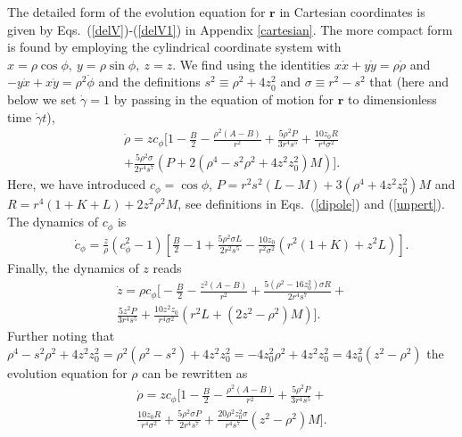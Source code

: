 The detailed form of the evolution equation for $\bm r$ in Cartesian coordinates is given by Eqs.~(\ref{delV})-(\ref{delV1}) in Appendix \ref{cartesian}. The more compact form is found by employing the cylindrical coordinate system with $x = \rho \cos\phi,\ y = \rho \sin\phi,\ z=z$. We find using the identities $x \dot x + y \dot y = \rho \dot\rho$ and $-y \dot x + x \dot y = \rho^2 \dot\phi$ and the definitions $s^2\equiv \rho^2+4z_0^2$ and $\sigma\equiv r^2-s^2$ that (here and below we set $\dot{\gamma}=1$ by passing in the equation of
motion for $\bm r$ to dimensionless time $\dot{\gamma} t$),
\begin{equation} \begin{aligned} %
\dot\rho = z c_{\phi}
[
1-\frac{B}{2}-\frac{\rho^2(A-B)}{r^2}
+\frac{5\rho^2 P}{3r^4s^5}
+\frac{10z_0 R}{r^4\sigma^2} \\
+\frac{5\rho^2\sigma}{2r^4s^7}
(P+2(\rho^4-s^2\rho^2+4z^2z_0^2)M)
].
\label{rho}
\end{aligned}
\end{equation}
Here, we have introduced $c_{\phi} = \cos\phi$, $P = r^2s^2(L-M)+3(\rho^4+4z^2z_0^2)M$ and
$R = r^4(1+K+L)+2z^2\rho^2M$, see definitions in Eqs.~(\ref{dipole}) and (\ref{unpert}). The dynamics of $c_{\phi}$ is
\begin{eqnarray}&&\!\!\!\!\!\!\!\!\!\!\!\!\!\!\!\!\!\!\!\!
\dot c_{\phi} = \frac{z}{\rho}(c_{\phi}^2-1)\left[
\frac{B}{2}-1+
\frac{5\rho^2\sigma L}{2r^2s^5}
-\frac{10z_0}{r^2\sigma^2}(r^2(1+K)+z^2L)
\right].
\label{phi1}
\end{eqnarray}
Finally, the dynamics of $z$ reads
\begin{equation} \begin{aligned} %
\dot z = \rho c_{\phi}
\bigg[
-\frac{B}{2}-\frac{z^2(A-B)}{r^2}
+\frac{5(\rho^2-16z_0^2)\sigma R}{2r^4s^7}
+\\ \frac{5z^2 P}{3r^4s^5} 
+\frac{10z^2 z_0}{r^4\sigma^2}(r^2 L+(2z^2-\rho^2)M)
\bigg].
\label{zz}
\end{aligned}
\end{equation}
Further noting that $\rho^4-s^2\rho^2+4z^2z_0^2 =
\rho^2(\rho^2-s^2)+4z^2z_0^2 =
-4z_0^2\rho^2+4z^2z_0^2 =
4z_0^2(z^2-\rho^2)$ the evolution equation for $\rho$ can be rewritten as
\begin{equation} \begin{aligned}  %
\dot\rho = z c_{\phi}
\bigg[
1-\frac{B}{2}-\frac{\rho^2(A-B)}{r^2}
+\frac{5\rho^2 P}{3r^4s^5} 
+ \\ \frac{10z_0 R}{r^4\sigma^2}
+\frac{5\rho^2\sigma P}{2r^4s^7} 
+\frac{20\rho^2 z_0^2\sigma}{r^4s^7}
(z^2-\rho^2)M
\bigg].
\label{rho2}
\end{aligned}
\end{equation}
